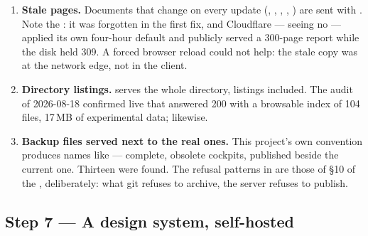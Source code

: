 \begin{enumerate}[leftmargin=1.4em]
\item \textbf{Stale pages.} Documents that change on every update
  (, , , , ) are sent
  with . Note the :
  it was forgotten in the first fix, and Cloudflare --- seeing no
   --- applied its own four-hour default and publicly
  served a 300-page report while the disk held 309. A forced browser reload
  could not help: the stale copy was at the network edge, not in the client.
\item \textbf{Directory listings.}  serves the
  whole directory, listings included. The audit of 2026-08-18 confirmed live
  that  answered 200 with a browsable index of 104 files,
  17\,MB of experimental data;  likewise.
\item \textbf{Backup files served next to the real ones.} This project's own
  convention produces names like  ---
  complete, obsolete cockpits, published beside the current one. Thirteen were
  found. The refusal patterns in  are those of \S10 of the
  , deliberately: what git refuses to archive, the server
  refuses to publish.
\end{enumerate}

\subsection{Step 7 --- A design system, self-hosted}
\label{ap:repro-web-design}

